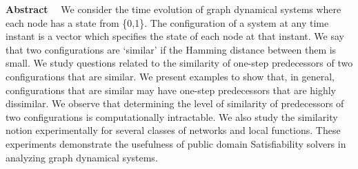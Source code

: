 
\noindent
\textbf{Abstract}~~
We consider the time evolution of graph dynamical systems 
where each node has a state from \{0,1\}.
The configuration of a system at any time instant 
is a vector which specifies the state of each node at that instant. 
We say that two configurations are `similar' 
if the Hamming distance between them is small. 
We study questions related to the similarity of one-step
predecessors of two configurations that are similar.
We present examples to show that, 
in general, configurations that are similar may
have one-step predecessors that are highly dissimilar.
We observe that determining the level of similarity of 
predecessors of two configurations is computationally intractable.
We also study the similarity notion experimentally for several classes
of networks and local functions.
These experiments demonstrate the usefulness
of public domain Satisfiability solvers in analyzing 
graph dynamical systems.
